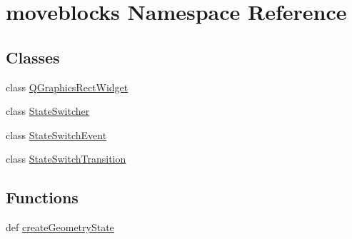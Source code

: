 \hypertarget{namespacemoveblocks}{}\section{moveblocks Namespace Reference}
\label{namespacemoveblocks}
\subsection*{Classes}
\begin{DoxyCompactItemize}
\item 
class \hyperlink{classmoveblocks_1_1QGraphicsRectWidget}{Q\+Graphics\+Rect\+Widget}
\item 
class \hyperlink{classmoveblocks_1_1StateSwitcher}{State\+Switcher}
\item 
class \hyperlink{classmoveblocks_1_1StateSwitchEvent}{State\+Switch\+Event}
\item 
class \hyperlink{classmoveblocks_1_1StateSwitchTransition}{State\+Switch\+Transition}
\end{DoxyCompactItemize}
\subsection*{Functions}
\begin{DoxyCompactItemize}
\item 
def \hyperlink{namespacemoveblocks_a0ad74b53c498f8dd97b3a612778b8661}{create\+Geometry\+State}
\end{DoxyCompactItemize}
